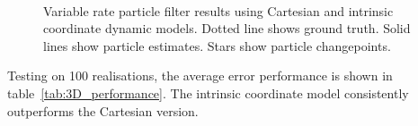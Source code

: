 \documentclass[conference]{IEEEtran}
\begin{document}
\begin{figure}
\centering
{}
\\
\caption{Variable rate particle filter results using Cartesian and intrinsic coordinate dynamic models. Dotted line shows ground truth. Solid lines show particle estimates. Stars show particle changepoints.}
\label{fig:3D_CartesianIntrinsic}
\end{figure}
%
Testing on 100 realisations, the average error performance is shown in table~\ref{tab:3D_performance}. The intrinsic coordinate model consistently outperforms the Cartesian version.
%
\end{document}
